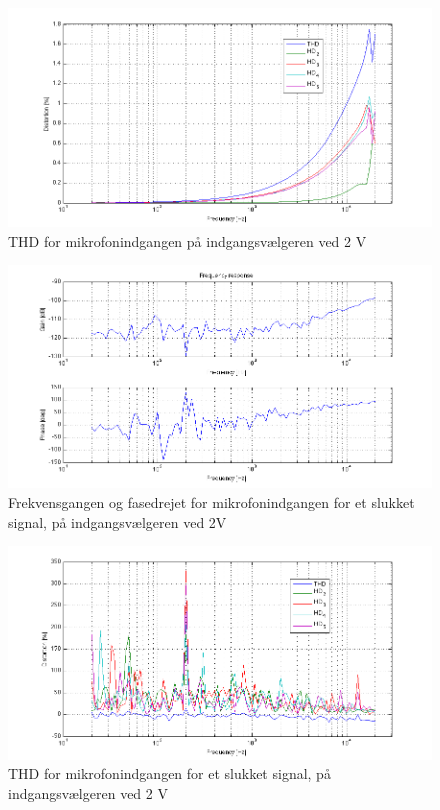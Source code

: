 \begin{figure}[h]
\centering
\includegraphics[width=\textwidth]{maalerapporter/indgangsvaelger/Indgangsvlger-mic-2v-thd.png}
\caption{THD for mikrofonindgangen på indgangsvælgeren ved 2 V}
\label{fig:apind:thd2v}
\end{figure}

\begin{figure}[h]
\centering
\includegraphics[width=\textwidth]{maalerapporter/indgangsvaelger/Indgangsvlger-mic-2v-slukket-frek.png}
\caption{Frekvensgangen og fasedrejet for mikrofonindgangen for et slukket signal, på indgangsvælgeren ved 2V}
\label{fig:apind:frek2vslukket}
\end{figure}

\begin{figure}[h]
\centering
\includegraphics[width=\textwidth]{maalerapporter/indgangsvaelger/Indgangsvlger-mic-2v-slukket-thd.png}
\caption{THD for mikrofonindgangen for et slukket signal, på indgangsvælgeren ved 2 V}
\label{fig:apind:thd2vslukket}
\end{figure}

